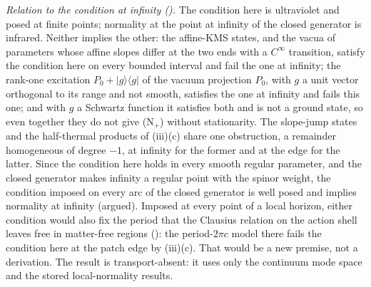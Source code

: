 \emph{Relation to the condition at infinity ().} The condition here is ultraviolet and posed at finite points; normality at the point at infinity of the closed generator is infrared. Neither implies the other: the affine-KMS states, and the vacua of parameters whose affine slopes differ at the two ends with a $C^{\infty}$ transition, satisfy the condition here on every bounded interval and fail the one at infinity; the rank-one excitation $P_{0} + |g\rangle\langle g|$ of the vacuum projection $P_{0}$, with $g$ a unit vector orthogonal to its range and not smooth, satisfies the one at infinity and fails this one; and with $g$ a Schwartz function it satisfies both and is not a ground state, so even together they do not give (N$_{+}$) without stationarity. The slope-jump states and the half-thermal products of (iii)(c) share one obstruction, a remainder homogeneous of degree $-1$, at infinity for the former and at the edge for the latter. Since the condition here holds in every smooth regular parameter, and the closed generator makes infinity a regular point with the spinor weight, the condition imposed on every arc of the closed generator is well posed and implies normality at infinity (argued). Imposed at every point of a local horizon, either condition would also fix the period that the Clausius relation on the action shell leaves free in matter-free regions (): the period-$2\pi c$ model there fails the condition here at the patch edge by (iii)(c). That would be a new premise, not a derivation. The result is transport-absent: it uses only the continuum mode space and the stored local-normality results.
